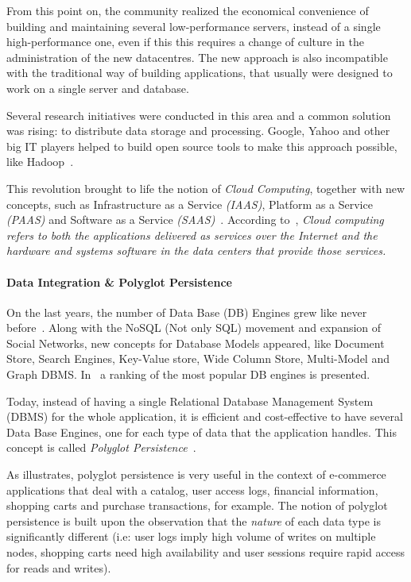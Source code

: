 \documentclass[conference, 10pt, a4paper]{IEEEtran}
\begin{document}
From this point on, the community realized the economical convenience of building and maintaining several low-performance servers, instead of a single high-performance one, even if this this requires a change of culture in the administration of the new datacentres.
The new approach is also incompatible with the traditional way of building applications, that usually were designed to work on a single server and database. 

Several research initiatives were conducted in this area and a common solution was rising: to distribute data storage and processing. 
Google, Yahoo and other big IT players helped to build open source tools to make this approach possible, like Hadoop~\cite{5496972}.

This revolution brought to life the notion of \textit{Cloud Computing}, together with new concepts, such as Infrastructure as a Service \textit{(IAAS)}, Platform as a Service \textit{(PAAS)} and Software as a Service \textit{(SAAS)}~\cite{AViewOfCloudComputing}.
According to~\cite{AViewOfCloudComputing}, \textit{Cloud computing refers to both the applications delivered as services over the Internet and the hardware and systems software in the data centers that provide those services.} 


\paragraph*{Data Integration \& Polyglot Persistence}
On the last years, the number of Data Base (DB) Engines grew like never before~\cite{dbranking}. 
Along with the NoSQL (Not only SQL) movement and expansion of Social Networks, new concepts for Database Models appeared, like Document Store, Search Engines, Key-Value store, Wide Column Store, Multi-Model and Graph DBMS. 
In~\cite{dbranking} a ranking of the most popular DB engines is presented.

Today, instead of having a single Relational Database Management System (DBMS) for the whole application, it is efficient and cost-effective to have several Data Base Engines, one for each type of data that the application handles. 
This concept is called \textit{Polyglot Persistence}~\cite{sadalage2012nosql}.

As \cite{AdressingDataManagementCloud} illustrates, polyglot persistence is very useful in the context of  e-commerce applications that deal with a catalog, user access logs, financial information, shopping carts and purchase transactions, for example.
The notion of polyglot persistence is built upon the observation that the \textit{nature} of each data type is significantly different (i.e: user logs imply high volume of writes on multiple nodes, shopping carts need high availability and user sessions require rapid access for reads and writes). 
\end{document}
